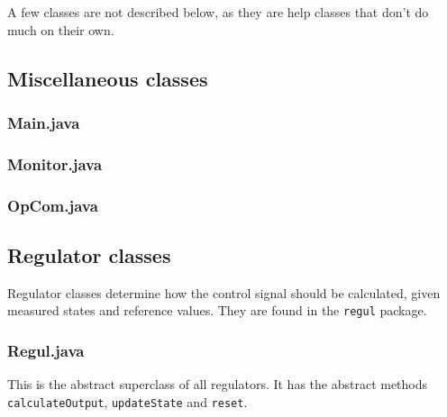 A few classes are not described below, as they are help classes that don't do much on their own. %






\subsection{Miscellaneous classes} 	%

\subsubsection{Main.java}

\subsubsection{Monitor.java}

\subsubsection{OpCom.java}








\subsection{Regulator classes}
Regulator classes determine how the control signal should be calculated, given measured states and reference values. They are found in the \texttt{regul} package.

\subsubsection{Regul.java}
This is the abstract superclass of all regulators. It has the abstract methods \texttt{calculateOutput}, \texttt{updateState} and \texttt{reset}.

